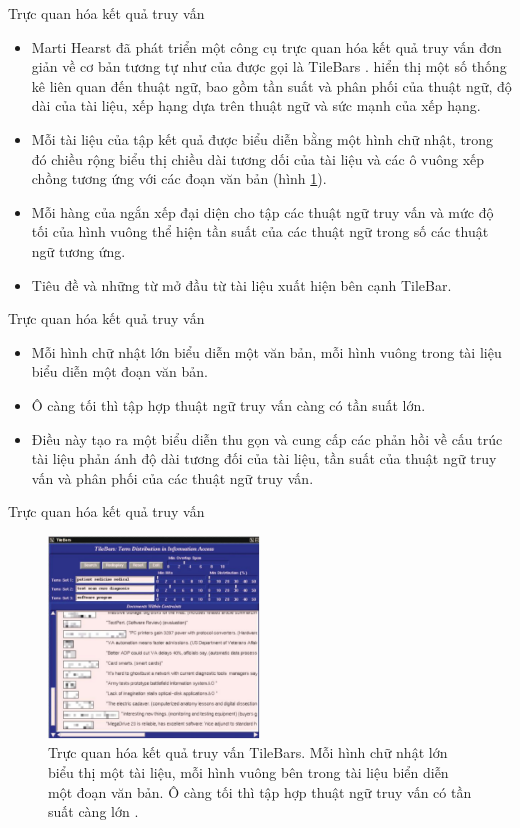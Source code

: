 \documentclass[10pt]{beamer}
\theoremstyle{remark}
\theoremstyle{definition}
\begin{document}
\begin{frame}{Trực quan hóa kết quả truy vấn}
	\begin{itemize}
		\item Marti Hearst đã phát triển một công cụ trực quan hóa kết quả truy vấn đơn giản về cơ bản tương tự như của \cite{232} được gọi là TileBars \cite{178}.
		hiển thị một số thống kê liên quan đến thuật ngữ, bao gồm tần suất và phân phối của thuật ngữ, độ dài của tài liệu, xếp hạng dựa trên thuật ngữ và sức mạnh của xếp hạng.
		\item  Mỗi tài liệu của tập kết quả được biểu diễn bằng một hình chữ nhật, trong đó chiều rộng biểu thị chiều dài tương dối của tài liệu và các ô vuông xếp chồng tương ứng với các đoạn văn bản (hình \ref{fig:14}).
		\item Mỗi hàng của ngắn xếp đại diện cho tập các thuật ngữ truy vấn và mức độ tối của hình vuông thể hiện tần suất của các thuật ngữ trong số các thuật ngữ tương ứng.
		\item Tiêu đề và những từ mở đầu từ tài liệu xuất hiện bên cạnh TileBar.
	\end{itemize}
\end{frame}

\begin{frame}{Trực quan hóa kết quả truy vấn}
	\begin{itemize}
		\item  Mỗi hình chữ nhật lớn biểu diễn một văn bản, mỗi hình vuông trong tài liệu biểu diễn một đoạn văn bản.
		\item Ô càng tối thì tập hợp thuật ngữ truy vấn càng có tần suất lớn.
		\item Điều này tạo ra một biểu diễn thu gọn và cung cấp các phản hồi về cấu trúc tài liệu phản ánh độ dài tương đối của tài liệu,
		tần suất của thuật ngữ truy vấn và phân phối của các thuật ngữ truy vấn.
	\end{itemize}
\end{frame}


\begin{frame}{Trực quan hóa kết quả truy vấn}
	\begin{figure}[h!]
        \centering
        \includegraphics[width=0.5\textwidth]{14.png}
        \caption{Trực quan hóa kết quả truy vấn TileBars.
        Mỗi hình chữ nhật lớn biểu thị một tài liệu, mỗi hình vuông bên trong tài liệu biển diễn một đoạn văn bản.
        Ô càng tối thì tập hợp thuật ngữ truy vấn có tần suất càng lớn \cite{178}.}
        \label{fig:14}
    \end{figure}
\end{frame}
\end{document}
